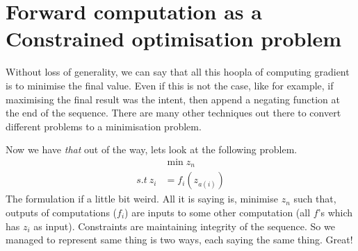 \documentclass[12pt,crop=false,class=article,convert={density=300,outext=.compiled.png}]{standalone}
\begin{document}
\section*{Forward computation as a Constrained optimisation problem}
Without loss of generality, we can say that all this hoopla of computing
gradient is to minimise the final value. Even if this is not the case,
like for example, if maximising the final result was the intent, then
append a negating function at the end of the sequence. There are many
other techniques out there to convert different problems to a
minimisation problem.

Now we have \emph{that} out of the way, lets look at the following
problem. 
%
\begin{align*}
  &\min{z_n}
  \\
  s.t~z_i &= f_i(z_{a(i)})
\end{align*}
%
The formulation if a little bit weird. All it is saying is, minimise
$z_n$ such that, outputs of computations ($f_i$) are inputs to some
other computation (all $f$'s which has $z_i$ as input). Constraints are
maintaining integrity of the sequence. So we managed to represent same
thing is two ways, each saying the same thing. Great!
\end{document}
